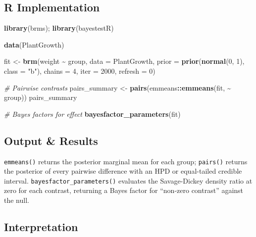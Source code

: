 \documentclass[
]{article}
\newenvironment{Shaded}{\begin{snugshade}}{\end{snugshade}}
\newcommand{\AttributeTok}[1]{\textcolor[rgb]{0.13,0.29,0.53}{#1}}
\newcommand{\CommentTok}[1]{\textcolor[rgb]{0.56,0.35,0.01}{\textit{#1}}}
\newcommand{\DecValTok}[1]{\textcolor[rgb]{0.00,0.00,0.81}{#1}}
\newcommand{\FunctionTok}[1]{\textcolor[rgb]{0.13,0.29,0.53}{\textbf{#1}}}
\newcommand{\NormalTok}[1]{#1}
\newcommand{\OtherTok}[1]{\textcolor[rgb]{0.56,0.35,0.01}{#1}}
\newcommand{\SpecialCharTok}[1]{\textcolor[rgb]{0.81,0.36,0.00}{\textbf{#1}}}
\newcommand{\StringTok}[1]{\textcolor[rgb]{0.31,0.60,0.02}{#1}}
\begin{document}
\subsection{R Implementation}\label{r-implementation}

\begin{Shaded}
\begin{Highlighting}[]
\FunctionTok{library}\NormalTok{(brms); }\FunctionTok{library}\NormalTok{(bayestestR)}

\FunctionTok{data}\NormalTok{(PlantGrowth)}

\NormalTok{fit }\OtherTok{\textless{}{-}} \FunctionTok{brm}\NormalTok{(weight }\SpecialCharTok{\textasciitilde{}}\NormalTok{ group, }\AttributeTok{data =}\NormalTok{ PlantGrowth,}
           \AttributeTok{prior =} \FunctionTok{prior}\NormalTok{(}\FunctionTok{normal}\NormalTok{(}\DecValTok{0}\NormalTok{, }\DecValTok{1}\NormalTok{), }\AttributeTok{class =} \StringTok{"b"}\NormalTok{),}
           \AttributeTok{chains =} \DecValTok{4}\NormalTok{, }\AttributeTok{iter =} \DecValTok{2000}\NormalTok{, }\AttributeTok{refresh =} \DecValTok{0}\NormalTok{)}

\CommentTok{\# Pairwise contrasts}
\NormalTok{pairs\_summary }\OtherTok{\textless{}{-}} \FunctionTok{pairs}\NormalTok{(emmeans}\SpecialCharTok{::}\FunctionTok{emmeans}\NormalTok{(fit, }\SpecialCharTok{\textasciitilde{}}\NormalTok{ group))}
\NormalTok{pairs\_summary}

\CommentTok{\# Bayes factors for effect}
\FunctionTok{bayesfactor\_parameters}\NormalTok{(fit)}
\end{Highlighting}
\end{Shaded}

\subsection{Output \& Results}\label{output-results}

\texttt{emmeans()} returns the posterior marginal mean for each group;
\texttt{pairs()} returns the posterior of every pairwise difference with
an HPD or equal-tailed credible interval.
\texttt{bayesfactor\_parameters()} evaluates the Savage-Dickey density
ratio at zero for each contrast, returning a Bayes factor for ``non-zero
contrast'' against the null.

\subsection{Interpretation}\label{interpretation}
\end{document}
